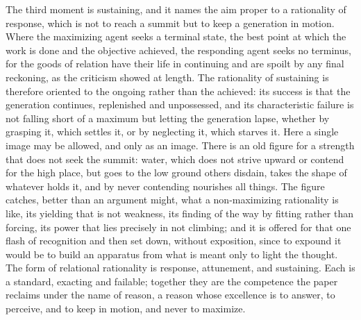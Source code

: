 The third moment is sustaining, and it names the aim proper to a rationality of response, which is not to reach a summit but to keep a generation in motion. Where the maximizing agent seeks a terminal state, the best point at which the work is done and the objective achieved, the responding agent seeks no terminus, for the goods of relation have their life in continuing and are spoilt by any final reckoning, as the criticism showed at length. The rationality of sustaining is therefore oriented to the ongoing rather than the achieved: its success is that the generation continues, replenished and unpossessed, and its characteristic failure is not falling short of a maximum but letting the generation lapse, whether by grasping it, which settles it, or by neglecting it, which starves it. Here a single image may be allowed, and only as an image. There is an old figure for a strength that does not seek the summit: water, which does not strive upward or contend for the high place, but goes to the low ground others disdain, takes the shape of whatever holds it, and by never contending nourishes all things. The figure catches, better than an argument might, what a non-maximizing rationality is like, its yielding that is not weakness, its finding of the way by fitting rather than forcing, its power that lies precisely in not climbing; and it is offered for that one flash of recognition and then set down, without exposition, since to expound it would be to build an apparatus from what is meant only to light the thought. The form of relational rationality is response, attunement, and sustaining. Each is a standard, exacting and failable; together they are the competence the paper reclaims under the name of reason, a reason whose excellence is to answer, to perceive, and to keep in motion, and never to maximize.
